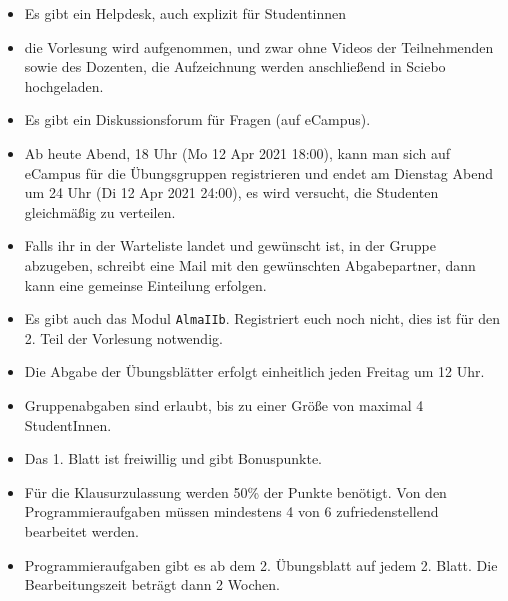 
\begin{itemize}
    \item Es gibt ein Helpdesk, auch explizit für Studentinnen
    \item die Vorlesung wird aufgenommen, und zwar ohne Videos der Teilnehmenden sowie des Dozenten, die Aufzeichnung werden anschließend in Sciebo hochgeladen.
    \item Es gibt ein Diskussionsforum für Fragen (auf eCampus).
    \item Ab heute Abend, 18 Uhr (Mo 12 Apr 2021 18:00), kann man sich auf eCampus für die Übungsgruppen registrieren und endet am Dienstag Abend um 24 Uhr (Di 12 Apr 2021 24:00), es wird versucht, die Studenten gleichmäßig zu verteilen.
    \item Falls ihr in der Warteliste landet und gewünscht ist, in der Gruppe abzugeben, schreibt eine Mail mit den gewünschten Abgabepartner, dann kann eine gemeinse Einteilung erfolgen.
    \item Es gibt auch das Modul \verb?AlmaIIb?. Registriert euch noch nicht, dies ist für den 2. Teil der Vorlesung notwendig. 
    \item Die Abgabe der Übungsblätter erfolgt einheitlich jeden Freitag um 12 Uhr.
    \item Gruppenabgaben sind erlaubt, bis zu einer Größe von maximal 4 StudentInnen.
    \item Das 1. Blatt ist freiwillig und gibt Bonuspunkte.
    \item Für die Klausurzulassung werden 50\% der Punkte benötigt. Von den Programmieraufgaben müssen mindestens 4 von 6 zufriedenstellend bearbeitet werden.
    \item Programmieraufgaben gibt es ab dem 2. Übungsblatt auf jedem 2. Blatt. Die Bearbeitungszeit beträgt dann 2 Wochen.
\end{itemize}


